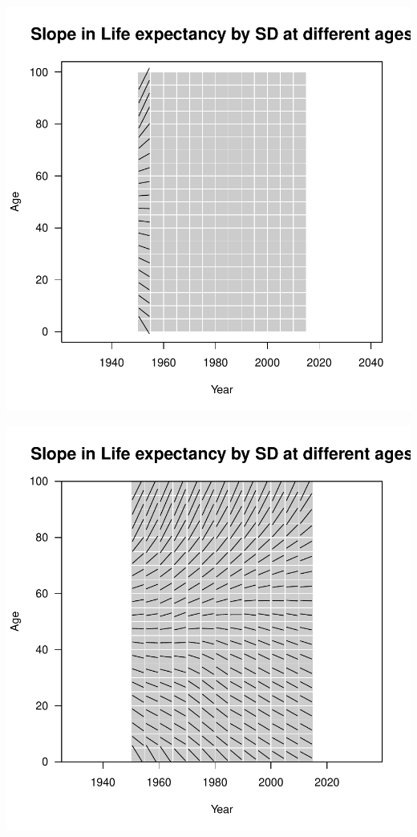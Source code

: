 \documentclass[xcolor={dvipsnames}]{beamer}
\begin{document}
\begin{frame}
		
			\begin{center}		
		\includegraphics[scale=.53]{Figures/Fig7}
				\end{center}
			
\end{frame}

\begin{frame}
		
			\begin{center}		
		\includegraphics[scale=.53]{Figures/Fig8}
				\end{center}
			
\end{frame}
\end{document}
